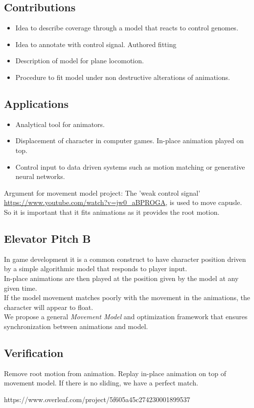 \documentclass[format=acmtog]{acmart}
\begin{document}
\subsection{Contributions}
\begin{itemize}
    \item Idea to describe coverage through a model that reacts to control genomes.
    \item Idea to annotate with control signal. Authored fitting
    \item Description of model for plane locomotion.
    \item Procedure to fit model under non destructive alterations of animations.
\end{itemize}
\subsection{Applications}
\begin{itemize}
    \item Analytical tool for animators.
    \item Displacement of character in computer games. In-place animation played on top.
    \item Control input to data driven systems such as motion matching or generative neural networks.
\end{itemize}


Argument for movement model project: The 'weak control signal' \url{https://www.youtube.com/watch?v=jw0_aBPROGA}, is used to move capusle. So it is important that it fits animations as it provides the root motion.


\subsection{Elevator Pitch B}
In game development it is a common construct to have character position driven by a simple algorithmic model that responds to player input.
\\ 
In-place animations are then played at the position given by the model at any given time.
\\
If the model movement matches poorly with the movement in the animations, the character will appear to float.
\\
We propose a general \textit{Movement Model} and optimization framework that ensures synchronization between animations and model. 

\subsection{Verification}
Remove root motion from animation. Replay in-place animation on top of movement model. If there is no sliding, we have a perfect match.









https://www.overleaf.com/project/5f605a45c274230001899537





{}

\end{document}
